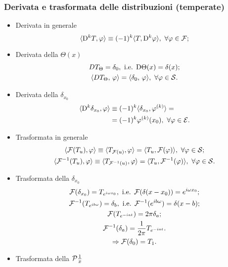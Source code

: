 \subsubsection*{Derivata e trasformata delle distribuzioni (temperate)}
    \begin{itemize}
    \item Derivata in generale
    \[
         \langle \D^kT,\varphi \rangle \equiv (-1)^k \langle T,\D^k\varphi \rangle,\ \forall \varphi \in \four;
    \]
    \item  Derivata della $\Theta(x)$
    \begin{gather*}
        D T_{\Theta} = \delta_0, \text{ i.e. }  \mathrm{D}\Theta(x) = \delta(x);\\
        \langle DT_\Theta,\, \varphi \rangle = \langle \delta_{0},\,\varphi \rangle,\ \forall \varphi \in \mathcal{S}.
    \end{gather*}
    \item Derivata della $\delta_{x_0}$
    \begin{align*}
        \langle \mathrm{D}^k \delta_{x_0}, \varphi \rangle &\equiv (-1)^k\langle \delta_{x_0},\varphi^{(k)}\rangle =\\
        &=(-1)^k\varphi^{(k)}(x_0),\ \forall\varphi\in\mathcal{E}.
    \end{align*}
    \item Trasformata in generale
    \begin{gather*}
        \langle \mathcal{F}(T_u),\varphi\rangle\equiv\langle T_{\mathcal{F}(u)}, \varphi\rangle=\langle T_u,\mathcal{F}(\varphi)\rangle,\ \forall\varphi\in \mathcal{S};\\
        \langle \mathcal{F}^{-1}(T_u),\varphi\rangle \equiv\langle T_{\mathcal{F}^{-1}(u)}, \varphi\rangle=\langle T_u,\mathcal{F}^{-1}(\varphi)\rangle,\ \forall\varphi\in \mathcal{S}.
    \end{gather*}
    \item Trasformata della  $\delta_{x_0}$
    \begin{gather*}
        \mathcal{F}(\delta_{x_0}) =T_{e^{i\omega x_0}}, \text{ i.e. }\mathcal{F}(\delta(x-x_0) ) = e^{i\omega x_0};\\
        \mathcal{F}^{-1}(T_{e^{ib\omega}}) = \delta_b, \text{ i.e. } \mathcal{F}^{-1}(e^{ib\omega})=\delta(x-b);\\
        \mathcal{F}(T_{e^{-iat}}) = 2\pi \delta_a;\\
        \mathcal{F}^{-1}(\delta_a)=\frac{1}{2\pi}T_{e^{-iat}}.\\
        \Rightarrow \mathcal{F}(\delta_0)=T_1.
    \end{gather*}
    \item Trasformata della $\mathcal{P}\frac{1}{x}$

\end{itemize}
